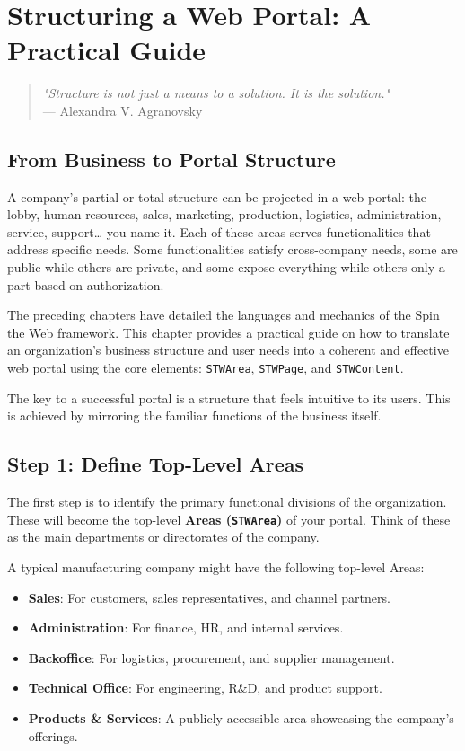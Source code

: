 \chapter{Structuring a Web Portal: A Practical Guide}
\label{chap:portal-structure}

\begin{quote}
\textit{"Structure is not just a means to a solution. It is the solution."} \\
— Alexandra V. Agranovsky
\end{quote}

\section{From Business to Portal Structure}
\label{sec:business-to-portal}

A company's partial or total structure can be projected in a web portal: the lobby, human resources, sales, marketing, production, logistics, administration, service, support… you name it. Each of these areas serves functionalities that address specific needs. Some functionalities satisfy cross-company needs, some are public while others are private, and some expose everything while others only a part based on authorization.

The preceding chapters have detailed the languages and mechanics of the Spin the Web framework. This chapter provides a practical guide on how to translate an organization's business structure and user needs into a coherent and effective web portal using the core \wbdl{} elements: \texttt{STWArea}, \texttt{STWPage}, and \texttt{STWContent}.

The key to a successful portal is a structure that feels intuitive to its users. This is achieved by mirroring the familiar functions of the business itself.

\section{Step 1: Define Top-Level Areas}
\label{sec:define-areas}

The first step is to identify the primary functional divisions of the organization. These will become the top-level \textbf{Areas (\texttt{STWArea})} of your portal. Think of these as the main departments or directorates of the company.

A typical manufacturing company might have the following top-level Areas:
\begin{itemize}
    \item \textbf{Sales}: For customers, sales representatives, and channel partners.
    \item \textbf{Administration}: For finance, HR, and internal services.
    \item \textbf{Backoffice}: For logistics, procurement, and supplier management.
    \item \textbf{Technical Office}: For engineering, R\&D, and product support.
    \item \textbf{Products \& Services}: A publicly accessible area showcasing the company's offerings.
\end{itemize}

